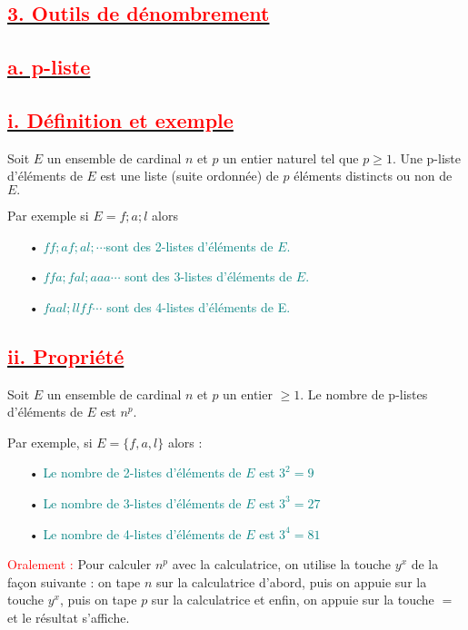 \documentclass[12pt]{article}
\begin{document}
\subsection*{\underline{\textbf{\textcolor{red}{3. Outils de dénombrement}}}}
\subsection*{\underline{\textbf{\textcolor{red}{a. p-liste}}}}
\subsection*{\underline{\textbf{\textcolor{red}{i. Définition et exemple }}}}
Soit $E$ un ensemble de cardinal $n$ et $p$ un entier naturel tel que $p \geq 1$. Une p-liste d’éléments de $E$ est une liste (suite ordonnée) de $p$ éléments distincts ou non de $E.$

Par exemple si $E = {f; a; l}$ alors
\begin{itemize}
\item[•] \textcolor{teal}{$ff; af ; al ;\cdots$sont des 2-listes d’éléments de $E$.}
\item[•] \textcolor{teal}{$ffa ; fal ;aaa\cdots$ sont des 3-listes d’éléments de $E$.}
\item[•] \textcolor{teal}{$faal ; llff\cdots$ sont des 4-listes d’éléments de E.}
\end{itemize}
\subsection*{\underline{\textbf{\textcolor{red}{ii. Propriété}}}}
Soit \(E\) un ensemble de cardinal \(n\) et \(p\) un entier \(\geq 1\). Le nombre de p-listes d’éléments de \(E\) est \(n^{p}\).

Par exemple, si \(E = \{f, a, l\}\) alors :
\begin{itemize}
    \item[•] \textcolor{teal}{Le nombre de 2-listes d’éléments de \(E\) est \(3^{2} = 9\)}
    \item[•] \textcolor{teal}{Le nombre de 3-listes d’éléments de \(E\) est \(3^{3} = 27\)}
    \item[•] \textcolor{teal}{Le nombre de 4-listes d’éléments de \(E\) est \(3^{4} = 81\)}
\end{itemize}

\textcolor{red}{Oralement :} Pour calculer \(n^{p}\) avec la calculatrice, on utilise la touche \(y^{x}\) de la façon suivante : on tape \(n\) sur la calculatrice d'abord, puis on appuie sur la touche \(y^{x}\), puis on tape \(p\) sur la calculatrice et enfin, on appuie sur la touche \(=\) et le résultat s’affiche.
\end{document}
